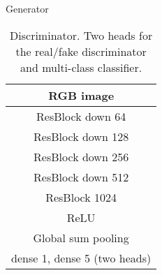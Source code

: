\documentclass{article}
\begin{document}
\begin{table}[ht!]
\begin{subtable}{.33\textwidth}
              \caption{Generator}
          \end{subtable}
          \begin{subtable}{.32\textwidth}
              \centering
              {\begin{tabular}{c}
                  \toprule
                  \midrule
                  RGB image  \\
                  \midrule
                  ResBlock down 64\\
                  \midrule
                  ResBlock down 128\\
                  \midrule
                  ResBlock down 256\\
                  \midrule
                  ResBlock down 512\\
                  \midrule
                  ResBlock 1024\\
                  \midrule
                  ReLU\\
                  \midrule
                  Global sum pooling\\
                  \midrule
                  dense  1, dense  5 (two heads)\\
                  \midrule
                  \bottomrule
              \end{tabular}}
              \caption{Discriminator. Two heads for the real/fake discriminator and multi-class classifier.}
          \end{subtable}
\end{table}
 
\end{document}
